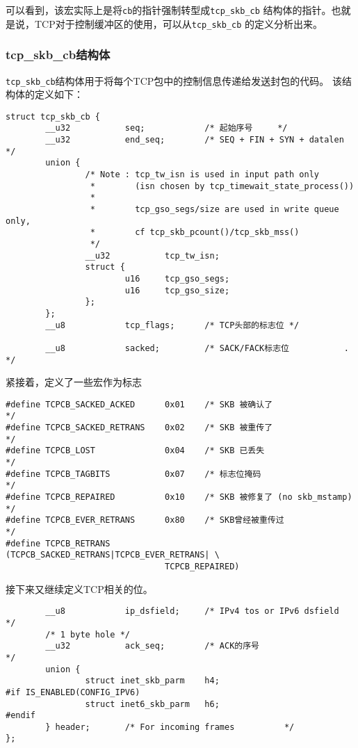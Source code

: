 可以看到，该宏实际上是将\texttt{cb}的指针强制转型成\texttt{tcp_skb_cb}
结构体的指针。也就是说，TCP对于控制缓冲区的使用，可以从\texttt{tcp_skb_cb}
的定义分析出来。

\subsubsection{tcp\_skb\_cb结构体}
\label{subsec:tcp_skb_sb_structure}
\texttt{tcp_skb_cb}结构体用于将每个TCP包中的控制信息传递给发送封包的代码。
该结构体的定义如下：
\begin{verbatim}
struct tcp_skb_cb {
        __u32           seq;            /* 起始序号     */
        __u32           end_seq;        /* SEQ + FIN + SYN + datalen    */
        union {
                /* Note : tcp_tw_isn is used in input path only
                 *        (isn chosen by tcp_timewait_state_process())
                 *
                 *        tcp_gso_segs/size are used in write queue only,
                 *        cf tcp_skb_pcount()/tcp_skb_mss()
                 */
                __u32           tcp_tw_isn;
                struct {
                        u16     tcp_gso_segs;
                        u16     tcp_gso_size;
                };
        };
        __u8            tcp_flags;      /* TCP头部的标志位 */

        __u8            sacked;         /* SACK/FACK标志位           .   */
\end{verbatim}
紧接着，定义了一些宏作为标志
\begin{verbatim}
#define TCPCB_SACKED_ACKED      0x01    /* SKB 被确认了                  */
#define TCPCB_SACKED_RETRANS    0x02    /* SKB 被重传了                  */
#define TCPCB_LOST              0x04    /* SKB 已丢失                    */
#define TCPCB_TAGBITS           0x07    /* 标志位掩码                    */
#define TCPCB_REPAIRED          0x10    /* SKB 被修复了 (no skb_mstamp)  */
#define TCPCB_EVER_RETRANS      0x80    /* SKB曾经被重传过                */
#define TCPCB_RETRANS           (TCPCB_SACKED_RETRANS|TCPCB_EVER_RETRANS| \
                                TCPCB_REPAIRED)
\end{verbatim}
接下来又继续定义TCP相关的位。
\begin{verbatim}
        __u8            ip_dsfield;     /* IPv4 tos or IPv6 dsfield     */
        /* 1 byte hole */
        __u32           ack_seq;        /* ACK的序号                     */
        union {
                struct inet_skb_parm    h4;
#if IS_ENABLED(CONFIG_IPV6)
                struct inet6_skb_parm   h6;
#endif
        } header;       /* For incoming frames          */
};
\end{verbatim}


